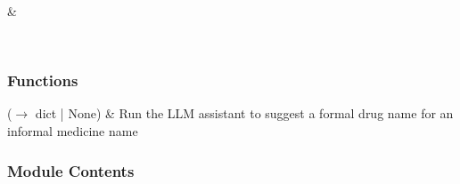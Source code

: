 \documentclass[letterpaper,10pt,english]{sphinxmanual}
\begin{document}
\begin{savenotes}\sphinxattablestart
\sphinxthistablewithglobalstyle
\sphinxthistablewithnovlinesstyle
\centering
\begin{tabulary}{\linewidth}[t]{}
\sphinxtoprule
\sphinxtableatstartofbodyhook
\sphinxAtStartPar
{}
&
\sphinxAtStartPar

\\
\sphinxbottomrule
\end{tabulary}
\sphinxtableafterendhook\par
\sphinxattableend\end{savenotes}


\subsubsection{Functions}
\label{\detokenize{autoapi/assistant/index:functions}}

\begin{savenotes}\sphinxattablestart
\sphinxthistablewithglobalstyle
\sphinxthistablewithnovlinesstyle
\centering
\begin{tabulary}{\linewidth}[t]{}
\sphinxtoprule
\sphinxtableatstartofbodyhook
\sphinxAtStartPar
{}(\(\rightarrow\) dict | None)
&
\sphinxAtStartPar
Run the LLM assistant to suggest a formal drug name for an informal medicine name
\\
\sphinxbottomrule
\end{tabulary}
\sphinxtableafterendhook\par
\sphinxattableend\end{savenotes}


\subsubsection{Module Contents}
\label{\detokenize{autoapi/assistant/index:module-contents}}
\end{document}
